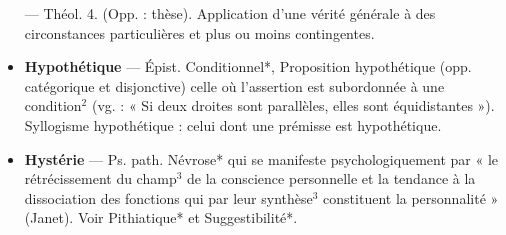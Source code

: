 \begin{itemize}[leftmargin=1cm, label=, itemsep=1pt]
— Théol. 4. (Opp. : thèse). Application d’une vérité générale à des
circonstances particulières et plus
ou moins contingentes.

\item {\bf Hypothétique} — Épist. Conditionnel*,
Proposition hypothétique (opp. catégorique et disjonctive) celle où
l’assertion est subordonnée à une
condition$^2$ (vg. : « Si deux droites sont
parallèles, elles sont équidistantes »).
Syllogisme hypothétique : celui dont
une prémisse est hypothétique.

\item {\bf Hystérie} — Ps. path. Névrose* qui
se manifeste psychologiquement par
« le rétrécissement du champ$^3$ de la
conscience personnelle et la tendance à la dissociation des fonctions qui par leur synthèse$^3$ constituent la personnalité » (Janet). Voir
Pithiatique* et Suggestibilité*.

	\end{itemize}

